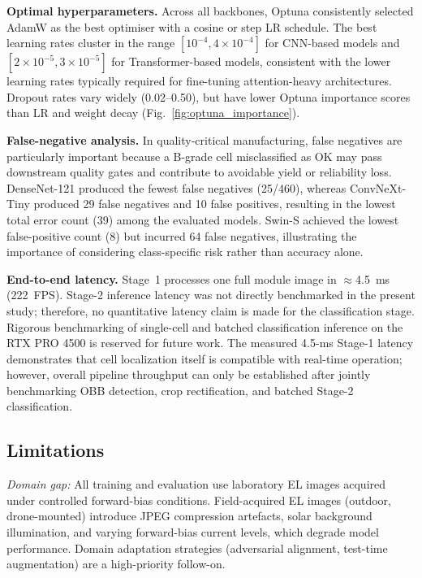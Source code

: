 \documentclass[conference]{IEEEtran}
\begin{document}
\textbf{Optimal hyperparameters.} Across all backbones, Optuna consistently selected AdamW as the best optimiser with a cosine or step LR schedule. The best learning rates cluster in the range $[10^{-4}, 4×10^{-4}]$ for CNN-based models and $[2×10^{-5}, 3×10^{-5}]$ for Transformer-based models, consistent with the lower learning rates typically required for fine-tuning attention-heavy architectures. Dropout rates vary widely (0.02--0.50), but have lower Optuna importance scores than LR and weight decay (Fig.~\ref{fig:optuna_importance}).

\textbf{False-negative analysis.} In quality-critical manufacturing, false negatives are particularly important because a B-grade cell misclassified as OK may pass downstream quality gates and contribute to avoidable yield or reliability loss. DenseNet-121 produced the fewest false negatives (25/460), whereas ConvNeXt-Tiny produced 29 false negatives and 10 false positives, resulting in the lowest total error count (39) among the evaluated models. Swin-S achieved the lowest false-positive count (8) but incurred 64 false negatives, illustrating the importance of considering class-specific risk rather than accuracy alone.

\textbf{End-to-end latency.} Stage~1 processes one full module image in $\approx$4.5~ms (222~FPS). Stage-2 inference latency was not directly benchmarked in the present study; therefore, no quantitative latency claim is made for the classification stage. Rigorous benchmarking of single-cell and batched classification inference on the RTX PRO 4500 is reserved for future work. The measured 4.5-ms Stage-1 latency demonstrates that cell localization itself is compatible with real-time operation; however, overall pipeline throughput can only be established after jointly benchmarking OBB detection, crop rectification, and batched Stage-2 classification.

\subsection{Limitations}

\textit{Domain gap:} All training and evaluation use laboratory EL images acquired under controlled forward-bias conditions. Field-acquired EL images (outdoor, drone-mounted) introduce JPEG compression artefacts, solar background illumination, and varying forward-bias current levels, which degrade model performance. Domain adaptation strategies (adversarial alignment, test-time augmentation) are a high-priority follow-on.
\end{document}
